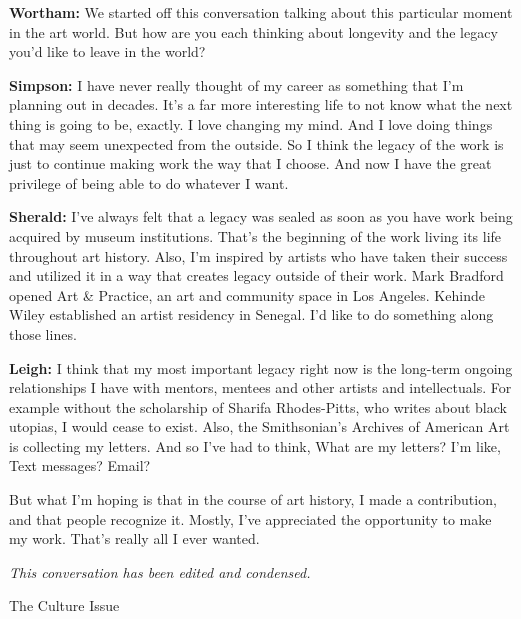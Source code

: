 \textbf{Wortham:} We started off this conversation talking about this
particular moment in the art world. But how are you each thinking about
longevity and the legacy you'd like to leave in the world?

\textbf{Simpson:} I have never really thought of my career as something
that I'm planning out in decades. It's a far more interesting life to
not know what the next thing is going to be, exactly. I love changing my
mind. And I love doing things that may seem unexpected from the outside.
So I think the legacy of the work is just to continue making work the
way that I choose. And now I have the great privilege of being able to
do whatever I want.

\textbf{Sherald:} I've always felt that a legacy was sealed as soon as
you have work being acquired by museum institutions. That's the
beginning of the work living its life throughout art history. Also, I'm
inspired by artists who have taken their success and utilized it in a
way that creates legacy outside of their work. Mark Bradford opened Art
\& Practice, an art and community space in Los Angeles. Kehinde Wiley
established an artist residency in Senegal. I'd like to do something
along those lines.

\textbf{Leigh:} I think that my most important legacy right now is the
long-term ongoing relationships I have with mentors, mentees and other
artists and intellectuals. For example without the scholarship of
Sharifa Rhodes-Pitts, who writes about black utopias, I would cease to
exist. Also, the Smithsonian's Archives of American Art is collecting my
letters. And so I've had to think, What are my letters? I'm like, Text
messages? Email?

But what I'm hoping is that in the course of art history, I made a
contribution, and that people recognize it. Mostly, I've appreciated the
opportunity to make my work. That's really all I ever wanted.

\emph{This conversation has been edited and condensed.}

The Culture Issue

